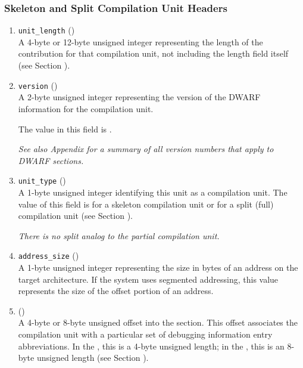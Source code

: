 \subsubsection{Skeleton and Split Compilation Unit Headers}
\label{datarep:skeletonandfullcompilationunitheaders}
\begin{enumerate}[1. ]

\item \texttt{unit\_length} () \\
A 4-byte or 12-byte 
unsigned integer representing the length
of the \dotdebuginfo{}
contribution for that compilation unit,
not including the length field itself
\bb
(see Section ).
\eb

\item  \texttt{version} (\HFTuhalf) \\
A 2-byte unsigned integer representing the version of the
DWARF information for the compilation unit.
 
The value in this field is \versiondotdebuginfo.

\textit{See also Appendix 
for a summary of all version numbers that apply to DWARF sections.}

\item \texttt{unit\_type} (\HFTubyte) \\
A 1-byte unsigned integer identifying this unit as a compilation unit.
The value of this field is 
\DWUTskeleton{} for a skeleton compilation unit or
\DWUTsplitcompile{} for a split (full) compilation unit
(see Section ).

\textit{There is no split analog to the partial compilation unit.}

\item \texttt{address\_size} (\HFTubyte) \\
A 1-byte unsigned integer representing the size in bytes of
an address on the target architecture. If the system uses
segmented addressing, this value represents the size of the
offset portion of an address.

\item \HFNdebugabbrevoffset{} () \\
A 
4-byte or 8-byte unsigned offset into the 
\dotdebugabbrev{}
section. This offset associates the compilation unit with a
particular set of debugging information entry abbreviations. In
the \thirtytwobitdwarfformat, this is a 4-byte unsigned length;
in the \sixtyfourbitdwarfformat, this is an 8-byte unsigned length
(see Section ).


\end{enumerate}
